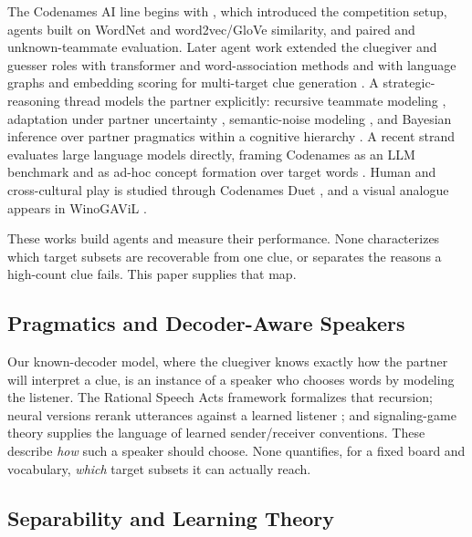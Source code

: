 \documentclass[11pt]{article}
\begin{document}
The Codenames AI line begins with \citet{kim2019cooperation}, which introduced
the competition setup, agents built on WordNet and word2vec/GloVe similarity, and
paired and unknown-teammate evaluation. Later agent work extended the cluegiver
and guesser roles with transformer and word-association methods
\citep{jaramillo2020word} and with language graphs and embedding scoring for
multi-target clue generation \citep{koyyalagunta2021playing}. A
strategic-reasoning thread models the partner explicitly: recursive teammate
modeling \citep{bills2023deductive}, adaptation under partner uncertainty
\citep{archibald2024adapting}, semantic-noise modeling
\citep{archibald2024noisy}, and Bayesian inference over partner pragmatics within
a cognitive hierarchy \citep{bills2025cooperation}. A recent strand evaluates
large language models directly, framing Codenames as an LLM benchmark
\citep{stephenson2024codenames} and as ad-hoc concept formation over target words
\citep{hakimov2025adhoc}. Human and cross-cultural play is studied through
Codenames Duet \citep{shaikh2023modeling, white2024communicate}, and a visual
analogue appears in WinoGAViL \citep{bitton2022winogavil}.

These works build agents and measure their performance. None characterizes which
target subsets are recoverable from one clue, or separates the reasons a
high-count clue fails. This paper supplies that map.

\subsection{Pragmatics and Decoder-Aware Speakers}

Our known-decoder model, where the cluegiver knows exactly how the partner will
interpret a clue, is an instance of a speaker who chooses words by modeling the
listener. The Rational Speech Acts framework \citep{frank2012predicting}
formalizes that recursion; neural versions rerank utterances against a learned
listener \citep{andreas2016pragmatics}; and signaling-game theory
\citep{lewis1969convention, skyrms2010signals} supplies the language of learned
sender/receiver conventions. These describe \emph{how} such a speaker should
choose. None quantifies, for a fixed board and vocabulary, \emph{which} target
subsets it can actually reach.

\subsection{Separability and Learning Theory}
\end{document}
